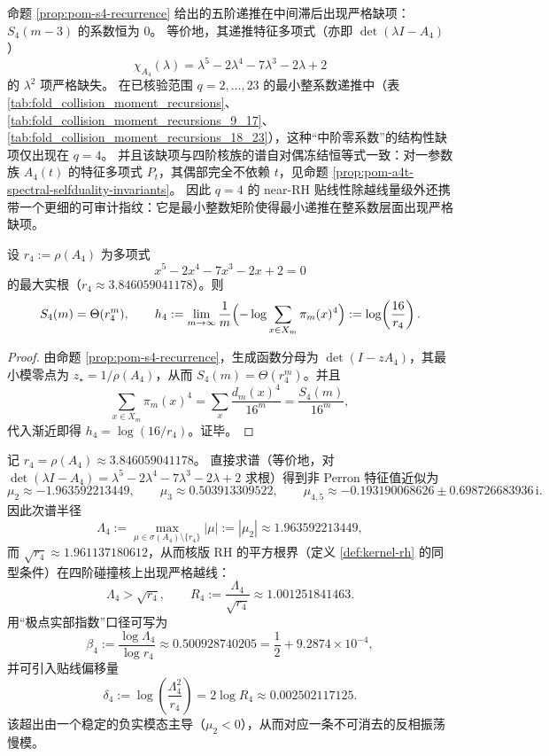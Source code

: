 \begin{remark}\label{rem:pom-s4-zero-coefficient-lock}
命题 \ref{prop:pom-s4-recurrence} 给出的五阶递推在中间滞后出现严格缺项：\(S_4(m-3)\) 的系数恒为 \(0\)。
等价地，其递推特征多项式（亦即 \(\det(\lambda I-A_4)\)）
\[
\chi_{A_4}(\lambda)=\lambda^5-2\lambda^4-7\lambda^3-2\lambda+2
\]
的 \(\lambda^2\) 项严格缺失。
在已核验范围 \(q=2,\dots,23\) 的最小整系数递推中（表 \ref{tab:fold_collision_moment_recursions}、\ref{tab:fold_collision_moment_recursions_9_17}、\ref{tab:fold_collision_moment_recursions_18_23}），这种“中阶零系数”的结构性缺项仅出现在 \(q=4\)。
并且该缺项与四阶核族的谱自对偶冻结恒等式一致：对一参数族 \(A_4(t)\) 的特征多项式 \(P_t\)，其偶部完全不依赖 \(t\)，见命题 \ref{prop:pom-a4t-spectral-selfduality-invariants}。
因此 \(q=4\) 的 near-RH 贴线性除越线量级外还携带一个更细的可审计指纹：它是最小整数矩阶使得最小递推在整系数层面出现严格缺项。
\end{remark}

\begin{corollary}\label{cor:pom-s4-asymptotic}
设 \(r_4:=\rho(A_4)\) 为多项式
$$
x^5-2x^4-7x^3-2x+2=0
$$
的最大实根（\(r_4\approx 3.846059041178\)）。则
$$
S_4(m)=\Theta(r_4^m),
\qquad
h_4:=\lim_{m\to\infty}\frac{1}{m}\Bigl(-\log\sum_{x\in X_m}\pi_m(x)^4\Bigr)
:=\log\!\left(\frac{16}{r_4}\right).
$$
\end{corollary}
\begin{proof}
由命题 \ref{prop:pom-s4-recurrence}，生成函数分母为 \(\det(I-zA_4)\)，其最小模零点为 \(z_\star=1/\rho(A_4)\)，从而 \(S_4(m)=\Theta(r_4^m)\)。并且
$$
\sum_{x\in X_m}\pi_m(x)^4=\sum_x\frac{d_m(x)^4}{16^m}=\frac{S_4(m)}{16^m},
$$
代入渐近即得 \(h_4=\log(16/r_4)\)。证毕。
\end{proof}


\begin{remark}\label{rem:pom-collision-rh-break-a4-spectrum}
记 \(r_4=\rho(A_4)\approx 3.846059041178\)。
直接求谱（等价地，对 \(\det(\lambda I-A_4)=\lambda^5-2\lambda^4-7\lambda^3-2\lambda+2\) 求根）得到非 Perron 特征值近似为
\[
\mu_2\approx -1.963592213449,\qquad
\mu_3\approx 0.503913309522,\qquad
\mu_{4,5}\approx -0.193190068626\pm 0.698726683936\,\mathrm{i}.
\]
因此次谱半径
\[
\Lambda_4:=\max_{\mu\in\sigma(A_4)\setminus\{r_4\}}|\mu|
:=|\mu_2|
\approx 1.963592213449,
\]
而
\(
\sqrt{r_4}\approx 1.961137180612
\)，从而核版 RH 的平方根界（定义 \ref{def:kernel-rh} 的同型条件）在四阶碰撞核上出现严格越线：
\[
\Lambda_4>\sqrt{r_4},\qquad
R_4:=\frac{\Lambda_4}{\sqrt{r_4}}\approx 1.001251841463.
\]
用“极点实部指数”口径可写为
\[
\beta_4:=\frac{\log \Lambda_4}{\log r_4}\approx 0.500928740205=\frac12+9.2874\times 10^{-4},
\]
并可引入贴线偏移量
\[
\delta_4:=\log\!\left(\frac{\Lambda_4^2}{r_4}\right)=2\log R_4\approx 0.002502117125.
\]
 该超出由一个稳定的负实模态主导（\(\mu_2<0\)），从而对应一条不可消去的反相振荡慢模。
\end{remark}

